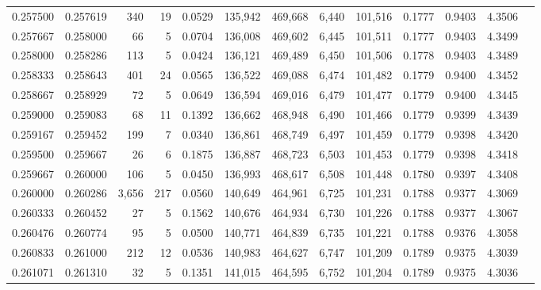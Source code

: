 \begin{tabular}{rrrrrrrrrrrrr}
0.257500 & 0.257619 &   340 &  19 &                                     0.0529 & 135,942 & 469,668 &   6,440 & 101,516 & 0.1777 & 0.9403 & 4.3506 \\
0.257667 & 0.258000 &    66 &   5 &                                     0.0704 & 136,008 & 469,602 &   6,445 & 101,511 & 0.1777 & 0.9403 & 4.3499 \\
0.258000 & 0.258286 &   113 &   5 &                                     0.0424 & 136,121 & 469,489 &   6,450 & 101,506 & 0.1778 & 0.9403 & 4.3489 \\
0.258333 & 0.258643 &   401 &  24 &                                     0.0565 & 136,522 & 469,088 &   6,474 & 101,482 & 0.1779 & 0.9400 & 4.3452 \\
0.258667 & 0.258929 &    72 &   5 &                                     0.0649 & 136,594 & 469,016 &   6,479 & 101,477 & 0.1779 & 0.9400 & 4.3445 \\
0.259000 & 0.259083 &    68 &  11 &                                     0.1392 & 136,662 & 468,948 &   6,490 & 101,466 & 0.1779 & 0.9399 & 4.3439 \\
0.259167 & 0.259452 &   199 &   7 &                                     0.0340 & 136,861 & 468,749 &   6,497 & 101,459 & 0.1779 & 0.9398 & 4.3420 \\
0.259500 & 0.259667 &    26 &   6 &                                     0.1875 & 136,887 & 468,723 &   6,503 & 101,453 & 0.1779 & 0.9398 & 4.3418 \\
0.259667 & 0.260000 &   106 &   5 &                                     0.0450 & 136,993 & 468,617 &   6,508 & 101,448 & 0.1780 & 0.9397 & 4.3408 \\
0.260000 & 0.260286 & 3,656 & 217 &                                     0.0560 & 140,649 & 464,961 &   6,725 & 101,231 & 0.1788 & 0.9377 & 4.3069 \\
0.260333 & 0.260452 &    27 &   5 &                                     0.1562 & 140,676 & 464,934 &   6,730 & 101,226 & 0.1788 & 0.9377 & 4.3067 \\
0.260476 & 0.260774 &    95 &   5 &                                     0.0500 & 140,771 & 464,839 &   6,735 & 101,221 & 0.1788 & 0.9376 & 4.3058 \\
0.260833 & 0.261000 &   212 &  12 &                                     0.0536 & 140,983 & 464,627 &   6,747 & 101,209 & 0.1789 & 0.9375 & 4.3039 \\
0.261071 & 0.261310 &    32 &   5 &                                     0.1351 & 141,015 & 464,595 &   6,752 & 101,204 & 0.1789 & 0.9375 & 4.3036 \\

\end{tabular}
